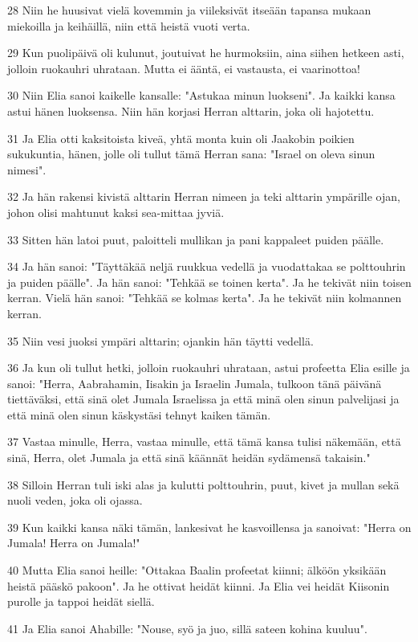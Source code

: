 \par 28 Niin he huusivat vielä kovemmin ja viileksivät itseään tapansa mukaan miekoilla ja keihäillä, niin että heistä vuoti verta.
\par 29 Kun puolipäivä oli kulunut, joutuivat he hurmoksiin, aina siihen hetkeen asti, jolloin ruokauhri uhrataan. Mutta ei ääntä, ei vastausta, ei vaarinottoa!
\par 30 Niin Elia sanoi kaikelle kansalle: "Astukaa minun luokseni". Ja kaikki kansa astui hänen luoksensa. Niin hän korjasi Herran alttarin, joka oli hajotettu.
\par 31 Ja Elia otti kaksitoista kiveä, yhtä monta kuin oli Jaakobin poikien sukukuntia, hänen, jolle oli tullut tämä Herran sana: "Israel on oleva sinun nimesi".
\par 32 Ja hän rakensi kivistä alttarin Herran nimeen ja teki alttarin ympärille ojan, johon olisi mahtunut kaksi sea-mittaa jyviä.
\par 33 Sitten hän latoi puut, paloitteli mullikan ja pani kappaleet puiden päälle.
\par 34 Ja hän sanoi: "Täyttäkää neljä ruukkua vedellä ja vuodattakaa se polttouhrin ja puiden päälle". Ja hän sanoi: "Tehkää se toinen kerta". Ja he tekivät niin toisen kerran. Vielä hän sanoi: "Tehkää se kolmas kerta". Ja he tekivät niin kolmannen kerran.
\par 35 Niin vesi juoksi ympäri alttarin; ojankin hän täytti vedellä.
\par 36 Ja kun oli tullut hetki, jolloin ruokauhri uhrataan, astui profeetta Elia esille ja sanoi: "Herra, Aabrahamin, Iisakin ja Israelin Jumala, tulkoon tänä päivänä tiettäväksi, että sinä olet Jumala Israelissa ja että minä olen sinun palvelijasi ja että minä olen sinun käskystäsi tehnyt kaiken tämän.
\par 37 Vastaa minulle, Herra, vastaa minulle, että tämä kansa tulisi näkemään, että sinä, Herra, olet Jumala ja että sinä käännät heidän sydämensä takaisin."
\par 38 Silloin Herran tuli iski alas ja kulutti polttouhrin, puut, kivet ja mullan sekä nuoli veden, joka oli ojassa.
\par 39 Kun kaikki kansa näki tämän, lankesivat he kasvoillensa ja sanoivat: "Herra on Jumala! Herra on Jumala!"
\par 40 Mutta Elia sanoi heille: "Ottakaa Baalin profeetat kiinni; älköön yksikään heistä pääskö pakoon". Ja he ottivat heidät kiinni. Ja Elia vei heidät Kiisonin purolle ja tappoi heidät siellä.
\par 41 Ja Elia sanoi Ahabille: "Nouse, syö ja juo, sillä sateen kohina kuuluu".
